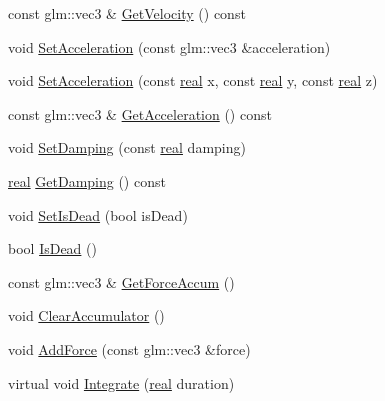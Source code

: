 \begin{DoxyCompactItemize}
\item 
const glm\+::vec3 \& \hyperlink{classrum_1_1_particle_adc199154d918e360103fa99f5b697604}{Get\+Velocity} () const
\item 
void \hyperlink{classrum_1_1_particle_a541556744b743995687bfabd42be67eb}{Set\+Acceleration} (const glm\+::vec3 \&acceleration)
\item 
void \hyperlink{classrum_1_1_particle_abfc528b024698e69b09b33ca6828f551}{Set\+Acceleration} (const \hyperlink{namespacerum_a7e8cca23573d5eaead0f138cbaa4862c}{real} x, const \hyperlink{namespacerum_a7e8cca23573d5eaead0f138cbaa4862c}{real} y, const \hyperlink{namespacerum_a7e8cca23573d5eaead0f138cbaa4862c}{real} z)
\item 
const glm\+::vec3 \& \hyperlink{classrum_1_1_particle_a2fee14e654f4914de9c5455d26223b86}{Get\+Acceleration} () const
\item 
void \hyperlink{classrum_1_1_particle_a9472726d229860f267dc8b7e8b7fe2cc}{Set\+Damping} (const \hyperlink{namespacerum_a7e8cca23573d5eaead0f138cbaa4862c}{real} damping)
\item 
\hyperlink{namespacerum_a7e8cca23573d5eaead0f138cbaa4862c}{real} \hyperlink{classrum_1_1_particle_a8635e9e5ab669d9d754195a265293dde}{Get\+Damping} () const
\item 
void \hyperlink{classrum_1_1_particle_acd315e7907736b20493e091651cff616}{Set\+Is\+Dead} (bool is\+Dead)
\item 
bool \hyperlink{classrum_1_1_particle_af9cc5e4971981a3ad4c59370aa80a6ee}{Is\+Dead} ()
\item 
const glm\+::vec3 \& \hyperlink{classrum_1_1_particle_aa13821d1abbcc67a90d37936b58c632b}{Get\+Force\+Accum} ()
\item 
void \hyperlink{classrum_1_1_particle_adb76d2210f9fc1f95839a3c116a52b38}{Clear\+Accumulator} ()
\item 
void \hyperlink{classrum_1_1_particle_afe6a59e7c46860227b61b57eee5a37b0}{Add\+Force} (const glm\+::vec3 \&force)
\item 
virtual void \hyperlink{classrum_1_1_particle_ac2200e991b81a380177275d6dd04ab64}{Integrate} (\hyperlink{namespacerum_a7e8cca23573d5eaead0f138cbaa4862c}{real} duration)
\end{DoxyCompactItemize}
